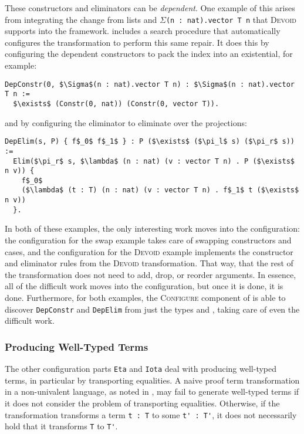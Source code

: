 These constructors and eliminators can be \textit{dependent}.
One example of this arises from integrating the change from lists and $\Sigma$\lstinline{(n : nat).vector T n} that
\textsc{Devoid} supports into the \toolname framework.
\toolname includes a search procedure that automatically configures the \toolname  
transformation to perform this same repair.
It does this by configuring the dependent constructors to pack the index into an existential, for example:

\begin{lstlisting}
DepConstr(0, $\Sigma$(n : nat).vector T n) : $\Sigma$(n : nat).vector T n :=
  $\exists$ (Constr(0, nat)) (Constr(0, vector T)).
\end{lstlisting}
and by configuring the eliminator to eliminate over the projections:

\begin{lstlisting}
DepElim(s, P) { f$_0$ f$_1$ } : P ($\exists$ ($\pi_l$ s) ($\pi_r$ s)) :=
  Elim($\pi_r$ s, $\lambda$ (n : nat) (v : vector T n) . P ($\exists$ n v)) {
    f$_0$
    ($\lambda$ (t : T) (n : nat) (v : vector T n) . f$_1$ t ($\exists$ n v))
  }. 
\end{lstlisting}

In both of these examples, the only interesting work moves into the configuration:
the configuration for the swap example takes care of swapping constructors and cases,
and the configuration for the \textsc{Devoid} example implements the constructor and eliminator rules from the \textsc{Devoid} transformation.
That way, that the rest of the \toolname transformation does not need to add, drop, or reorder arguments.
In essence, all of the difficult work moves into the configuration, but once it is done, it is done.
Furthermore, for both examples, the \textsc{Configure} component of \toolname is able to discover \lstinline{DepConstr}
and \lstinline{DepElim} from just the types \A and \B, taking care of even the difficult work.

\subsubsection{Producing Well-Typed Terms}
\label{sec:equality}

The other configuration parts \lstinline{Eta} and \lstinline{Iota} deal with producing well-typed terms,
in particular by transporting equalities.
A naive proof term transformation in a non-univalent language, as noted in \citet{tabareau2019marriage},
may fail to generate well-typed terms if it does not consider the problem of transporting equalities.
Otherwise, if the transformation transforms a term \lstinline{t : T} to some \lstinline{t' : T'}, it does not necessarily
hold that it transforms \lstinline{T} to \lstinline{T'}.

